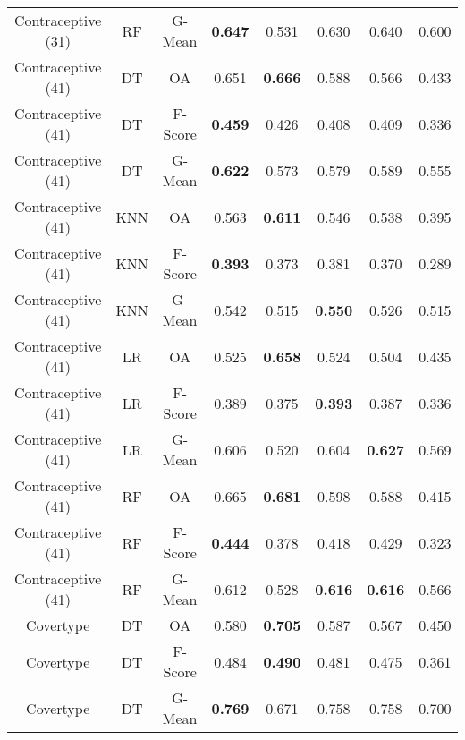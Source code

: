 \begin{longtable}{cccccccc}
Contraceptive (31) &         RF &  G-Mean & \textbf{0.647} &          0.531 &          0.630 &          0.640 &          0.600 \\
Contraceptive (41) &         DT &      OA &          0.651 & \textbf{0.666} &          0.588 &          0.566 &          0.433 \\
Contraceptive (41) &         DT & F-Score & \textbf{0.459} &          0.426 &          0.408 &          0.409 &          0.336 \\
Contraceptive (41) &         DT &  G-Mean & \textbf{0.622} &          0.573 &          0.579 &          0.589 &          0.555 \\
Contraceptive (41) &        KNN &      OA &          0.563 & \textbf{0.611} &          0.546 &          0.538 &          0.395 \\
Contraceptive (41) &        KNN & F-Score & \textbf{0.393} &          0.373 &          0.381 &          0.370 &          0.289 \\
Contraceptive (41) &        KNN &  G-Mean &          0.542 &          0.515 & \textbf{0.550} &          0.526 &          0.515 \\
Contraceptive (41) &         LR &      OA &          0.525 & \textbf{0.658} &          0.524 &          0.504 &          0.435 \\
Contraceptive (41) &         LR & F-Score &          0.389 &          0.375 & \textbf{0.393} &          0.387 &          0.336 \\
Contraceptive (41) &         LR &  G-Mean &          0.606 &          0.520 &          0.604 & \textbf{0.627} &          0.569 \\
Contraceptive (41) &         RF &      OA &          0.665 & \textbf{0.681} &          0.598 &          0.588 &          0.415 \\
Contraceptive (41) &         RF & F-Score & \textbf{0.444} &          0.378 &          0.418 &          0.429 &          0.323 \\
Contraceptive (41) &         RF &  G-Mean &          0.612 &          0.528 & \textbf{0.616} & \textbf{0.616} &          0.566 \\
         Covertype &         DT &      OA &          0.580 & \textbf{0.705} &          0.587 &          0.567 &          0.450 \\
         Covertype &         DT & F-Score &          0.484 & \textbf{0.490} &          0.481 &          0.475 &          0.361 \\
         Covertype &         DT &  G-Mean & \textbf{0.769} &          0.671 &          0.758 &          0.758 &          0.700 \\

\end{longtable}
